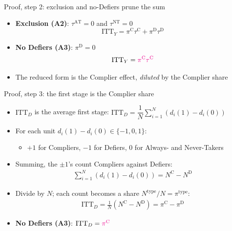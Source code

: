\documentclass[table, xcolor = {dvipsnames}, 9pt]{beamer}
\theoremstyle{plain}
\newcommand{\mh}[1]{{\color{magenta}{#1}}}
\newcommand{\ITTY}{\mathrm{ITT}_Y}
\newcommand{\ITTD}{\mathrm{ITT}_D}
\begin{document}
\begin{frame}[t]{Proof, step 2: exclusion and no-Defiers prune the sum}
\vfill
\begin{itemize} \vfill
\item \textbf{Exclusion (A2)}: $\tau^{\textrm{AT}} = 0$ and $\tau^{\textrm{NT}} = 0$ \vfill
\begin{equation*}
\ITTY = \pi^{\textrm{C}} \tau^{\textrm{C}} + \pi^{\textrm{D}} \tau^{\textrm{D}}
\end{equation*} \vfill
\item \textbf{No Defiers (A3)}: $\pi^{\textrm{D}} = 0$ \vfill
\begin{equation*}
\ITTY = \mh{\pi^{\textrm{C}} \tau^{\textrm{C}}}
\end{equation*} \vfill
\item The reduced form is the Complier effect, \emph{diluted} by the Complier share \vfill
\end{itemize} \vfill
\end{frame}
\begin{frame}[t]{Proof, step 3: the first stage is the Complier share}
\vfill
\begin{itemize} \vfill
\item $\ITTD$ is the average first stage: $\ITTD = \dfrac{1}{N}\sum_{i=1}^{N} \left(d_i(1) - d_i(0)\right)$ \vfill
\item For each unit $d_i(1) - d_i(0) \in \{-1, 0, 1\}$: \vfill
\begin{itemize} \vfill
\item $+1$ for Compliers, $-1$ for Defiers, $0$ for Always- and Never-Takers \vfill
\end{itemize} \vfill
\item Summing, the $\pm 1$'s count Compliers against Defiers: \vfill
\begin{align*}
\sum_{i=1}^{N} \left(d_i(1) - d_i(0)\right) = N^{\textrm{C}} - N^{\textrm{D}}
\end{align*} \vfill
\item Divide by $N$; each count becomes a share $N^{\textrm{type}}/N = \pi^{\textrm{type}}$: \vfill
\begin{align*}
\ITTD = \frac{1}{N}\left(N^{\textrm{C}} - N^{\textrm{D}}\right) = \pi^{\textrm{C}} - \pi^{\textrm{D}}
\end{align*} \vfill
\item \textbf{No Defiers (A3)}: $\ITTD = \mh{\pi^{\textrm{C}}}$ \vfill
\end{itemize} \vfill
\end{frame}
\end{document}
